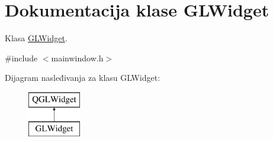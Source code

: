 \hypertarget{classGLWidget}{}\section{Dokumentacija klase G\+L\+Widget}
\label{classGLWidget}


Klasa \hyperlink{classGLWidget}{G\+L\+Widget}.  




{\ttfamily \#include $<$mainwindow.\+h$>$}

Dijagram nasleđivanja za klasu G\+L\+Widget\+:\begin{figure}[H]
\begin{center}
\leavevmode
\includegraphics[height=2.000000cm]{classGLWidget}
\end{center}
\end{figure}
